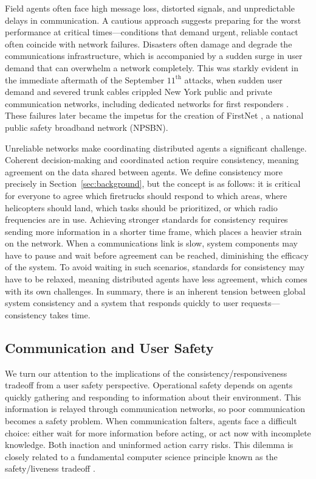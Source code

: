 \documentclass[]             %
{NASA}                       %
\theoremstyle{definition}
\begin{document}
Field agents often face high message loss, distorted signals, and unpredictable delays in communication. A cautious approach suggests preparing for the worst performance at critical times---conditions that demand urgent, reliable contact often coincide with network failures. Disasters often damage and degrade the communications infrastructure, which is accompanied by a sudden surge in user demand that can overwhelm a network completely. This was starkly evident in the immediate aftermath of the September $11^\textrm{th}$ attacks, when sudden user demand and severed trunk cables crippled New York public and private communication networks, including dedicated networks for first responders \cite{2011:Reardon}. These failures later became the impetus for the creation of FirstNet \cite{2021:firstnet, 2021:firstnet2}, a national public safety broadband network (NPSBN).

Unreliable networks make coordinating distributed agents a significant
challenge. Coherent decision-making and coordinated action require
consistency, meaning agreement on the data shared between agents. We
define consistency more precisely in Section~\ref{sec:background}, but
the concept is as follows: it is critical for everyone to agree which
firetrucks should respond to which areas, where helicopters should
land, which tasks should be prioritized, or which radio frequencies
are in use. Achieving stronger standards for consistency requires
sending more information in a shorter time frame, which places a
heavier strain on the network. When a communications link is slow,
system components may have to pause and wait before agreement can be
reached, diminishing the efficacy of the system. To avoid waiting in
such scenarios, standards for consistency may have to be relaxed,
meaning distributed agents have less agreement, which comes with its
own challenges. In summary, there is an inherent tension between
global system consistency and a system that responds quickly to user requests---consistency takes time.

\subsection{Communication and User Safety}
\label{ssec:communication-and-safety}
We turn our attention to the implications of the
consistency/responsiveness tradeoff from a user safety
perspective. Operational safety depends on agents quickly gathering
and responding to information about their environment. This
information is relayed through communication networks, so poor
communication becomes a safety problem. When communication falters,
agents face a difficult choice: either wait for more information
before acting, or act now with incomplete knowledge. Both inaction and
uninformed action carry risks. This dilemma is closely related to a
fundamental computer science principle known as the safety/liveness
tradeoff \cite{ALPERN1985181}.
\end{document}
